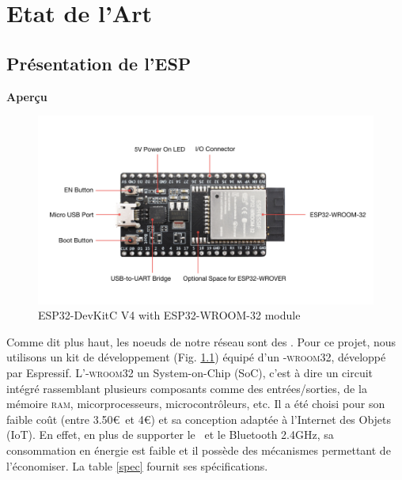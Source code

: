 \chapter{Etat de l'Art}

\section{Présentation de l'ESP}
    \textbf{Aperçu}

    \begin{figure}[H]
        \centering
        \includegraphics[scale=0.3]{images/esp32-devkitc.jpg}
        \caption{ESP32-DevKitC V4 with ESP32-WROOM-32 module
            \cite{esp32-gettingStarted_w}}
        \label{esp32_img}
    \end{figure}
    Comme dit plus haut, les noeuds de notre réseau sont des \esp.
    Pour ce projet, nous utilisons un kit de développement (Fig. \ref{esp32_img}) équipé d'un
    \esp\textsc{-wroom32}, développé par Espressif. L'\esp\textsc{-wroom32}
    un System-on-Chip (SoC), c'est à dire un circuit intégré rassemblant plusieurs
    composants comme des entrées/sorties, de la mémoire \textsc{ram}, micorprocesseurs,
    microcontrôleurs, etc.
    Il a été choisi pour son faible coût (entre 3.50\euro\ et 4\euro) et sa conception adaptée à l'Internet des Objets (IoT). 
    En effet, en plus de supporter le \wifi\ et le Bluetooth 2.4GHz,
    sa consommation en énergie est faible et il possède des mécanismes permettant de l'économiser. %
    La table \ref{spec} fournit ses spécifications.
